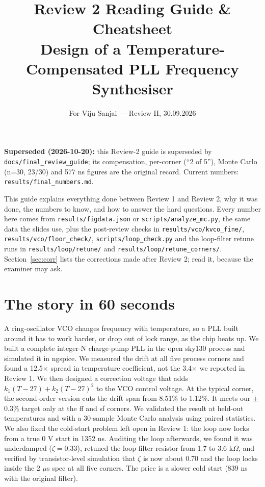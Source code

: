 \documentclass[11pt,a4paper]{article}
\title{\color{navy}\textbf{Review 2 Reading Guide \& Cheatsheet}\\[4pt]\large Design of a Temperature-Compensated PLL Frequency Synthesiser}
\author{For Viju Sanjai --- Review II, 30.09.2026}
\date{}
\begin{document}
\noindent\textbf{Superseded (2026-10-20):} this Review-2 guide is superseded by \texttt{docs/final\_review\_guide}; its compensation, per-corner (``2 of 5''), Monte Carlo (n=30, 23/30) and 577 ns figures are the original record. Current numbers: \texttt{results/final\_numbers.md}.
\medskip
\maketitle
\vspace{-1.5em}
\noindent This guide explains everything done between Review 1 and Review 2, why it was done, the numbers to know, and how to answer the hard questions. Every number here comes from \texttt{results/figdata.json} or \texttt{scripts/analyze\_mc.py}, the same data the slides use, plus the post-review checks in \texttt{results/vco/}\allowbreak\texttt{kvco\_fine/}, \texttt{results/vco/}\allowbreak\texttt{floor\_check/}, \texttt{scripts/}\allowbreak\texttt{loop\_check.py} and the loop-filter retune runs in \texttt{results/loop/}\allowbreak\texttt{retune/} and \texttt{results/loop/}\allowbreak\texttt{retune\_corners/}. Section~\ref{sec:corr} lists the corrections made after Review 2; read it, because the examiner may ask.

\tableofcontents
\newpage

\section{The story in 60 seconds}
\begin{say}
A ring-oscillator VCO changes frequency with temperature, so a PLL built around it has to work harder, or drop out of lock range, as the chip heats up. We built a complete integer-N charge-pump PLL in the open sky130 process and simulated it in ngspice. We measured the drift at all five process corners and found a 12.5$\times$ spread in temperature coefficient, not the 3.4$\times$ we reported in Review 1. We then designed a correction voltage that adds $k_1(T-27)+k_2(T-27)^2$ to the VCO control voltage. At the typical corner, the second-order version cuts the drift span from 8.51\% to 1.12\%. It meets our $\pm$0.3\% target only at the ff and sf corners. We validated the result at held-out temperatures and with a 30-sample Monte Carlo analysis using paired statistics. We also fixed the cold-start problem left open in Review 1: the loop now locks from a true 0 V start in 1352 ns. Auditing the loop afterwards, we found it was underdamped ($\zeta=0.33$), retuned the loop-filter resistor from 1.7 to 3.6 k$\Omega$, and verified by transistor-level simulation that $\zeta$ is now about 0.70 and the loop locks inside the 2 $\mu$s spec at all five corners. The price is a slower cold start (839 ns with the original filter).
\end{say}
\end{document}
